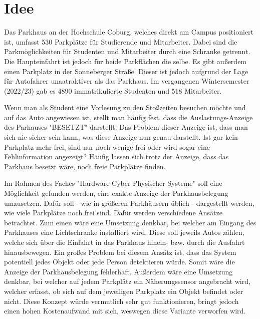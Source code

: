 \section{Idee}\label{ch:Einleitung}
Das Parkhaus an der Hochschule Coburg, welches direkt am Campus positioniert ist, umfasst 530 Parkplätze für Studierende und Mitarbeiter. Dabei sind die Parkmöglichkeiten für Studenten und Mitarbeiter durch eine Schranke getrennt. Die Haupteinfahrt ist jedoch für beide Parkflächen die selbe. Es gibt außerdem einen Parkplatz in der Sonneberger Straße. Dieser ist jedoch aufgrund der Lage für Autofahrer unaatraktiver als das Parkhaus. Im vergangenen Wintersemester (2022/23) gab es 4890 immatrikulierte Studenten und 518 Mitarbeiter. 

Wenn man als Student eine Vorlesung zu den Stoßzeiten besuchen möchte und auf das Auto angewiesen ist, stellt man häufig fest, dass die Auslastungs-Anzeige des Parhauses "BESETZT" darstellt. Das Problem dieser Anzeige ist, dass man sich nie sicher sein kann, was diese Anzeige nun genau darstellt. Ist gar kein Parkplatz mehr frei, sind nur noch wenige frei oder wird sogar eine Fehlinformation angezeigt? Häufig lassen sich trotz der Anzeige, dass das Parkhaus besetzt wäre, noch freie Parkplätze finden.

Im Rahmen des Faches "Hardware Cyber Physischer Systeme" soll eine Möglichkeit gefunden werden, eine exakte Anzeige der Parkhausbelegung umzusetzen. Dafür soll - wie in größeren Parkhäusern üblich - dargestellt werden, wie viele Parkplätze noch frei sind. Dafür werden verschiedene Ansätze betrachtet. Zum einen wäre eine Umsetzung denkbar, bei welcher am Eingang des Parkhauses eine Lichtschranke installiert wird. Diese soll jeweils Autos zählen, welche sich über die Einfahrt in das Parkhaus hinein- bzw. durch die Ausfahrt hinausbewegen. Ein großes Problem bei diesem Ansätz ist, dass das System potentiell jedes Objekt oder jede Person detektieren würde. Somit wäre die Anzeige der Parkhausbelegung fehlerhaft. Außerdem wäre eine Umsetzung denkbar, bei welcher auf jedem Parkplätz ein Näherungssensor angebracht wird, welcher erfasst, ob sich auf dem jeweiligen Parkplatz ein Objekt befindet oder nicht. Diese Konzept würde vermutlich sehr gut funktionieren, bringt jedoch einen hohen Kostenaufwand mit sich, weswegen diese Variante verworfen wird.

